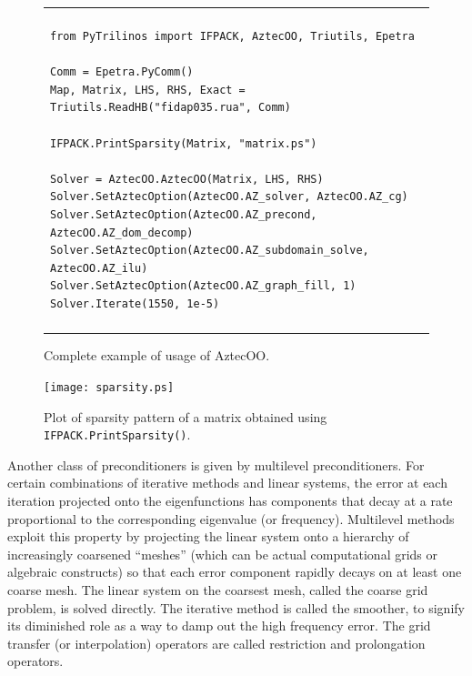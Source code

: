 \documentclass[acmtocl]{acmtrans2m}
\begin{document}
\begin{figure}
  \begin{center}
    \begin{tabular}{| p{12cm} |}
      \hline
      \\
      \footnotesize
      \begin{minipage}{11.5cm}
\begin{verbatim}
from PyTrilinos import IFPACK, AztecOO, Triutils, Epetra

Comm = Epetra.PyComm()
Map, Matrix, LHS, RHS, Exact = Triutils.ReadHB("fidap035.rua", Comm)

IFPACK.PrintSparsity(Matrix, "matrix.ps")

Solver = AztecOO.AztecOO(Matrix, LHS, RHS)
Solver.SetAztecOption(AztecOO.AZ_solver, AztecOO.AZ_cg)
Solver.SetAztecOption(AztecOO.AZ_precond, AztecOO.AZ_dom_decomp)
Solver.SetAztecOption(AztecOO.AZ_subdomain_solve, AztecOO.AZ_ilu)
Solver.SetAztecOption(AztecOO.AZ_graph_fill, 1)
Solver.Iterate(1550, 1e-5)
\end{verbatim}
      \end{minipage}
      \\
      \\
      \hline
    \end{tabular}
    \caption{Complete example of usage of AztecOO.}
    \label{fig:aztecoo}
  \end{center}
\end{figure}

\begin{figure}
  \begin{center}
    \texttt{[image: sparsity.ps]}
    \caption{Plot of sparsity pattern of a matrix obtained using
      {\tt IFPACK.PrintSparsity()}.}
    \label{fig:sparsity}
  \end{center}
\end{figure}

\medskip

Another class of preconditioners is given by multilevel
preconditioners.  For certain combinations of iterative methods and
linear systems, the error at each iteration projected onto the
eigenfunctions has components that decay at a rate proportional to the
corresponding eigenvalue (or frequency).  Multilevel methods exploit
this property \cite{Briggs} by projecting the linear system onto a
hierarchy of increasingly coarsened ``meshes'' (which can be actual
computational grids or algebraic constructs) so that each error
component rapidly decays on at least one coarse mesh.  The linear
system on the coarsest mesh, called the coarse grid problem, is solved
directly.  The iterative method is called the smoother, to signify its
diminished role as a way to damp out the high frequency error.  The
grid transfer (or interpolation) operators are called restriction and
prolongation operators.
\end{document}
